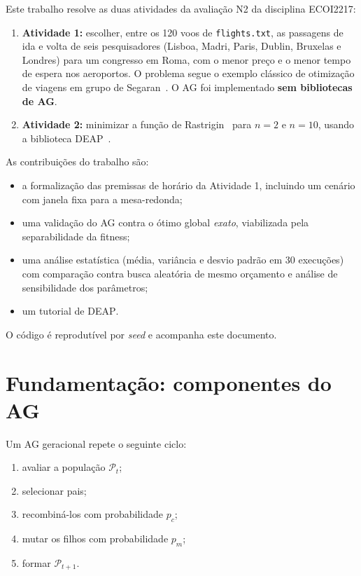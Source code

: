 \documentclass[conference]{IEEEtran}
\newcommand{\deap}{\textsc{DEAP}}
\newcommand{\code}[1]{\texttt{#1}}
\begin{document}
Este trabalho resolve as duas atividades da avaliação N2 da disciplina ECOI2217:
\begin{enumerate}
  \item \textbf{Atividade 1:} escolher, entre os 120 voos de \code{flights.txt}, as passagens de ida e volta de seis pesquisadores (Lisboa, Madri, Paris, Dublin, Bruxelas e Londres) para um congresso em Roma, com o menor preço e o menor tempo de espera nos aeroportos. O problema segue o exemplo clássico de otimização de viagens em grupo de Segaran~\cite{segaran2007}. O AG foi implementado \textbf{sem bibliotecas de AG}.
  \item \textbf{Atividade 2:} minimizar a função de Rastrigin~\cite{surjanovic2013} para $n=2$ e $n=10$, usando a biblioteca \deap{}~\cite{fortin2012deap}.
\end{enumerate}

As contribuições do trabalho são:
\begin{itemize}
  \item a formalização das premissas de horário da Atividade 1, incluindo um cenário com janela fixa para a mesa-redonda;
  \item uma validação do AG contra o ótimo global \emph{exato}, viabilizada pela separabilidade da fitness;
  \item uma análise estatística (média, variância e desvio padrão em 30 execuções) com comparação contra busca aleatória de mesmo orçamento e análise de sensibilidade dos parâmetros;
  \item um tutorial de \deap{}.
\end{itemize}
O código é reprodutível por \emph{seed} e acompanha este documento.

\section{Fundamentação: componentes do AG}
\label{sec:ga}
Um AG geracional repete o seguinte ciclo:
\begin{enumerate}
  \item avaliar a população $\mathcal{P}_t$;
  \item selecionar pais;
  \item recombiná-los com probabilidade $p_c$;
  \item mutar os filhos com probabilidade $p_m$;
  \item formar $\mathcal{P}_{t+1}$.
\end{enumerate}
\end{document}
